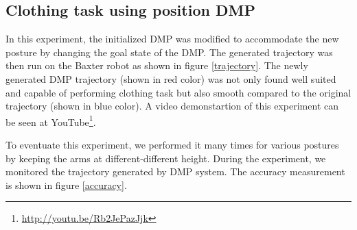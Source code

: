\documentclass[sigconf]{acmart}
\begin{document}
\subsection{Clothing task using position DMP}
In this experiment, the initialized DMP was modified to accommodate the new posture by changing the goal state of the DMP. The generated trajectory was then run on the Baxter robot as shown in figure \ref{trajectory}. The newly generated DMP trajectory (shown in red color) was not only found well suited and capable of performing clothing task but also smooth compared to the original trajectory (shown in blue color). A video demonstartion of this experiment can be seen at YouTube\footnote{\url{http://youtu.be/Rb2JePazJjk}}.

To eventuate this experiment, we performed it many times for various postures by keeping the arms at different-different height. During the experiment, we monitored the trajectory generated by DMP system. The accuracy measurement is shown in figure \ref{accuracy}.
\end{document}
